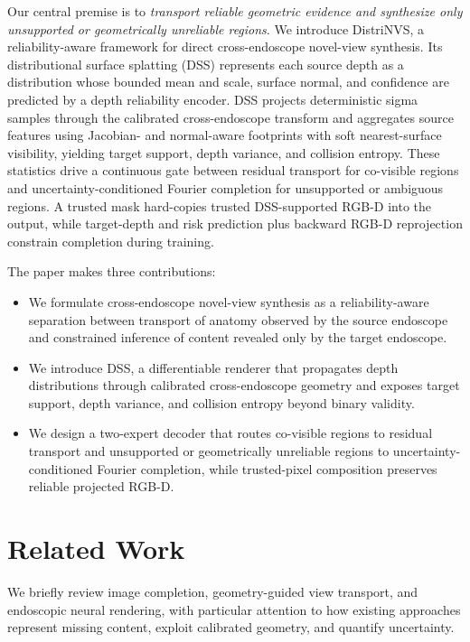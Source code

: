 \documentclass[letterpaper,10pt,conference]{ieeeconf}
\begin{document}
Our central premise is to \emph{transport reliable geometric evidence and
synthesize only unsupported or geometrically unreliable regions}. We introduce
DistriNVS, a reliability-aware framework
for direct cross-endoscope novel-view synthesis. Its distributional surface
splatting (DSS) represents each source depth as a distribution whose bounded
mean and scale, surface normal, and confidence are predicted by a depth
reliability encoder. DSS projects deterministic sigma samples through the
calibrated cross-endoscope transform and aggregates source features using
Jacobian- and normal-aware footprints with soft nearest-surface visibility,
yielding target support, depth variance, and collision entropy. These statistics
drive a continuous gate between residual transport for co-visible regions and
uncertainty-conditioned Fourier completion for unsupported or ambiguous
regions. A trusted mask hard-copies trusted DSS-supported RGB-D into the output,
while target-depth and risk prediction plus backward RGB-D reprojection constrain
completion during training.

The paper makes three contributions:
\begin{itemize}
    \item We formulate cross-endoscope novel-view synthesis as a
    reliability-aware separation between transport of anatomy observed by the
    source endoscope and constrained inference of content revealed only by the
    target endoscope.
    \item We introduce DSS, a differentiable renderer that propagates depth
    distributions through calibrated cross-endoscope geometry and exposes
    target support, depth variance, and collision entropy beyond binary validity.
    \item We design a two-expert decoder that routes co-visible regions to
    residual transport and unsupported or geometrically unreliable regions to uncertainty-conditioned
    Fourier completion, while trusted-pixel composition preserves reliable
    projected RGB-D.
\end{itemize}

\section{Related Work}
\label{sec:related}

We briefly review image completion, geometry-guided view transport, and
endoscopic neural rendering, with particular attention to how existing
approaches represent missing content, exploit calibrated geometry, and quantify
uncertainty.
\end{document}
